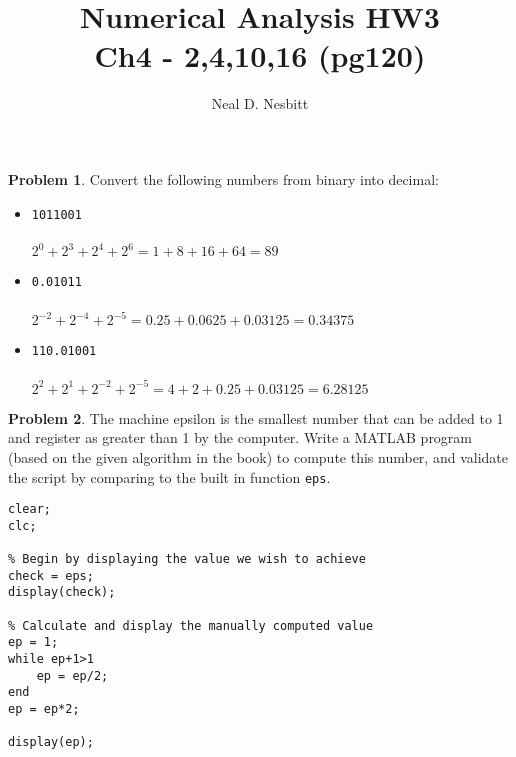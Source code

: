 \documentclass{article}
\title{Numerical Analysis HW3\\
Ch4 - 2,4,10,16 (pg120)}
\author{Neal D. Nesbitt}
\begin{document}
\maketitle

\theoremstyle{definition}
\newtheorem{problem}{Problem}


\setcounter{problem}{1}
\begin{problem}

	Convert the following numbers from binary into decimal:
	
\end{problem}

\begin{itemize}

	\item \verb|1011001|\\
	\\
	$2^{0} + 2^{3} + 2^{4} + 2^{6} = 1 + 8 + 16 + 64 = \boxed{89}$
	
	\item \verb|0.01011|\\
	\\
	$2^{-2} + 2^{-4} + 2^{-5} = 0.25 + 0.0625 + 0.03125 = \boxed{0.34375}$
	
	\item \verb|110.01001|\\
	\\
	$2^{2} + 2^{1} + 2^{-2} + 2^{-5} = 4 + 2 + 0.25 + 0.03125 = \boxed{6.28125}$
		
\end{itemize}

\setcounter{problem}{3}
\begin{problem}

	The machine epsilon is the smallest number that can be added to 1 and register as greater than 1 by the computer. Write a MATLAB program (based on the given algorithm in the book) to compute this number, and validate the script by comparing to the built in function \verb|eps|.
	
\end{problem}
	
\begin{lstlisting}[frame=single]
% Clear our memory and working space
clear;
clc;

% Begin by displaying the value we wish to achieve
check = eps;
display(check);

% Calculate and display the manually computed value
ep = 1;
while ep+1>1
	ep = ep/2;
end
ep = ep*2;

display(ep);
\end{lstlisting}
\end{document}
